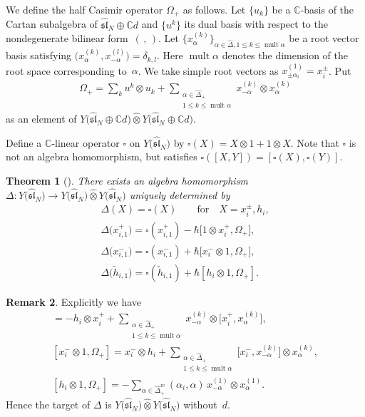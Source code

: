 \documentclass[pdftex]{sigma}
\newtheorem{thm}{Theorem}[section]
\theoremstyle{definition}
\newtheorem{rem}[thm]{Remark}
\numberwithin{equation}{section}
\DeclareMathOperator{\mult}{mult}
\newcommand{\bbC}{\mathbb{C}}
\newcommand{\affY}{Y\big(\affsl\big)}
\newcommand{\affsl}{\hat{\mathfrak{sl}}_N}
\begin{document}
We define the half Casimir operator $\Omega_+$ as follows. Let $\{u_k\}$ be a $\bbC$-basis of the Cartan subalgebra of $\affsl \oplus \bbC d$ and $\big\{u^k\big\}$ its dual basis with respect to the nondegenerate bilinear form~$(\, ,\, )$. Let $\big\{x_{\alpha}^{(k)}\big\}_{\alpha \in \hat{\Delta}, 1 \leq k \leq \mult \alpha}$ be a root vector basis satisfying $\big(x_{\alpha}^{(k)},x_{-\alpha}^{(l)}\big) = \delta_{k,l}$. Here $\mult \alpha$ denotes the dimension of the root space corresponding to~$\alpha$. We take simple root vectors as $x_{\pm \alpha_i}^{(1)} = x_i^{\pm}$. Put
\begin{gather*}
\Omega_+ = \sum_{k} u^k \otimes u_k + \sum_{\substack{\alpha \in \hat{\Delta}_+ \\ 1 \leq k \leq \mult \alpha}} x_{-\alpha}^{(k)} \otimes x_{\alpha}^{(k)}
\end{gather*}
as an element of $Y\big(\affsl \oplus \bbC d\big) \widehat{\otimes} Y\big(\affsl \oplus \bbC d\big)$.

Define a $\bbC$-linear operator $\square$ on $\affY$ by $\square(X) = X \otimes 1 + 1 \otimes X$. Note that $\square$ is not an algebra homomorphism, but satisfies $\square([X,Y]) = [\square(X), \square(Y)]$.
\begin{thm}[{\cite[Definition~4.6, Theorem~4.9, Proposition~5.18, Section~7]{MR3861718}}]\label{thm:definition_of_coproduct} There exists an algebra homomorphism $\Delta \colon \affY \to \affY \widehat{\otimes} \affY$ uniquely determined by
\begin{gather*}
\Delta(X) = \square(X) \qquad \text{for} \quad X=x_{i}^{\pm}, h_i,\\
\Delta\big(x_{i,1}^+\big) = \square(x_{i,1}^+) - \hbar \big[1 \otimes x_i^+, \Omega_+\big],\\
\Delta\big(x_{i,1}^-\big) = \square(x_{i,1}^-) + \hbar \big[x_i^- \otimes 1, \Omega_+\big],\\
\Delta\big(\tilde{h}_{i,1}\big)= \square(\tilde{h}_{i,1}) + \hbar [h_i \otimes 1, \Omega_+].
\end{gather*}
\end{thm}
\begin{rem}Explicitly we have
\begin{gather*}
[1 \otimes x_i^+, \Omega_+] = -h_i \otimes x_i^+ + \sum_{\substack{\alpha \in \hat{\Delta}_+\\ 1 \leq k \leq \mult \alpha}} x_{-\alpha}^{(k)} \otimes \big[x_i^+, x_{\alpha}^{(k)}\big],
\\
[x_i^- \otimes 1, \Omega_+] = x_i^- \otimes h_i + \sum_{\substack{\alpha \in \hat{\Delta}_+\\ 1 \leq k \leq \mult \alpha}} \big[x_i^-, x_{-\alpha}^{(k)}\big] \otimes x_{\alpha}^{(k)},
\\
[h_i \otimes 1, \Omega_+] = - \sum_{\alpha \in \hat{\Delta}_+^{\mathrm{re}}} (\alpha_i,\alpha)\, x_{-\alpha}^{(1)} \otimes x_{\alpha}^{(1)}.
\end{gather*}
Hence the target of $\Delta$ is $\affY \widehat{\otimes} \affY$ without~$d$.
\end{rem}
\end{document}
